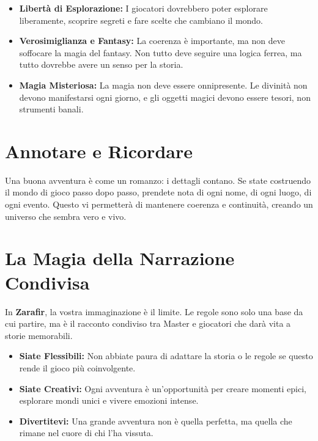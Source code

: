 \documentclass[../manuale_main.tex]{subfiles}
\begin{document}
\begin{itemize}
\item \textbf{Libertà di Esplorazione:} I giocatori dovrebbero poter esplorare liberamente, scoprire segreti e fare scelte che cambiano il mondo.
\item \textbf{Verosimiglianza e Fantasy:} La coerenza è importante, ma non deve soffocare la magia del fantasy. Non tutto deve seguire una logica ferrea, ma tutto dovrebbe avere un senso per la storia.
\item \textbf{Magia Misteriosa:} La magia non deve essere onnipresente. Le divinità non devono manifestarsi ogni giorno, e gli oggetti magici devono essere tesori, non strumenti banali.
\end{itemize}

\vspace{0.3cm}

\section*{Annotare e Ricordare}
Una buona avventura è come un romanzo: i dettagli contano. Se state costruendo il mondo di gioco passo dopo passo, prendete nota di ogni nome, di ogni luogo, di ogni evento. Questo vi permetterà di mantenere coerenza e continuità, creando un universo che sembra vero e vivo.

\vspace{0.3cm}

\section*{La Magia della Narrazione Condivisa}
In \textbf{Zarafir}, la vostra immaginazione è il limite. Le regole sono solo una base da cui partire, ma è il racconto condiviso tra Master e giocatori che darà vita a storie memorabili. 

\begin{itemize}
\item \textbf{Siate Flessibili:} Non abbiate paura di adattare la storia o le regole se questo rende il gioco più coinvolgente.
\item \textbf{Siate Creativi:} Ogni avventura è un’opportunità per creare momenti epici, esplorare mondi unici e vivere emozioni intense.
\item \textbf{Divertitevi:} Una grande avventura non è quella perfetta, ma quella che rimane nel cuore di chi l’ha vissuta.
\end{itemize}
\end{document}
